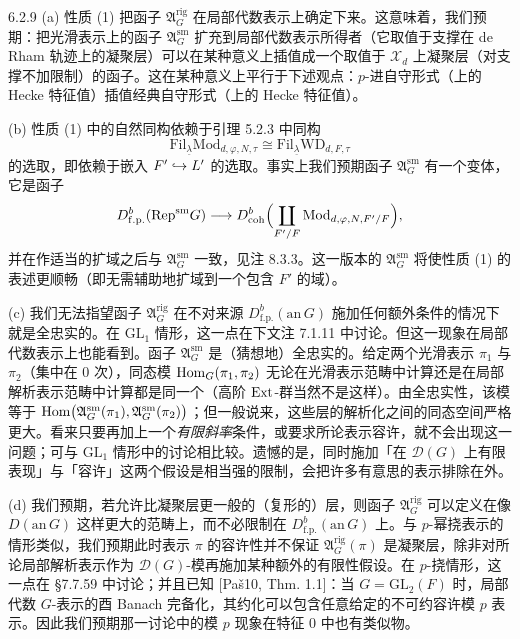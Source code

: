 \begin{rem}{6.2.9}
(a) 性质 (1) 把函子 $\mathfrak A^{\mathrm{rig}}_G$ 在局部代数表示上确定下来。这意味着，我们预期：把光滑表示上的函子 $\mathfrak A^{\mathrm{sm}}_G$ 扩充到局部代数表示所得者（它取值于支撑在 de Rham 轨迹上的凝聚层）可以在某种意义上插值成一个取值于 $\mathcal X_d$ 上凝聚层（对支撑不加限制）的函子。这在某种意义上平行于下述观点：$p$-进自守形式（上的 Hecke 特征值）插值经典自守形式（上的 Hecke 特征值）。

(b) 性质 (1) 中的自然同构依赖于引理 5.2.3 中同构
\[
\mathrm{Fil}_{\underline\lambda}\mathrm{Mod}_{d,\varphi,N,\tau}
\cong\mathrm{Fil}_{\underline\lambda}\mathrm{WD}_{d,F,\tau}
\]
的选取，即依赖于嵌入 $F'\hookrightarrow L'$ 的选取。事实上我们预期函子 $\mathfrak A^{\mathrm{sm}}_G$ 有一个变体，它是函子
\[
D^b_{\mathrm{f.p.}}(\mathrm{Rep}^{\mathrm{sm}}G)
\longrightarrow D^b_{\mathrm{coh}}\Bigl(\coprod_{F'/F}\mathrm{Mod}_{d,\varphi,N,F'/F}\Bigr),
\]
并在作适当的扩域之后与 $\mathfrak A^{\mathrm{sm}}_G$ 一致，见注 8.3.3。这一版本的 $\mathfrak A^{\mathrm{sm}}_G$ 将使性质 (1) 的表述更顺畅（即无需辅助地扩域到一个包含 $F'$ 的域）。
\end{rem}

(c) 我们无法指望函子 $\mathfrak A^{\mathrm{rig}}_G$ 在不对来源 $D^b_{\mathrm{f.p.}}(\mathrm{an}\,G)$ 施加任何额外条件的情况下就是全忠实的。在 $\mathrm{GL}_1$ 情形，这一点在下文注 7.1.11 中讨论。但这一现象在局部代数表示上也能看到。函子 $\mathfrak A^{\mathrm{sm}}_G$ 是（猜想地）全忠实的。给定两个光滑表示 $\pi_1$ 与 $\pi_2$（集中在 0 次），同态模 $\operatorname{Hom}_G(\pi_1,\pi_2)$ 无论在光滑表示范畴中计算还是在局部解析表示范畴中计算都是同一个（高阶 $\operatorname{Ext}$-群当然不是这样）。由全忠实性，该模等于 $\operatorname{Hom}\bigl(\mathfrak A^{\mathrm{sm}}_G(\pi_1),\mathfrak A^{\mathrm{sm}}_G(\pi_2)\bigr)$；但一般说来，这些层的解析化之间的同态空间严格更大。看来只要再加上一个\emph{有限斜率}条件，或要求所论表示容许，就不会出现这一问题；可与 $\mathrm{GL}_1$ 情形中的讨论相比较。遗憾的是，同时施加「在 $\mathcal D(G)$ 上有限表现」与「容许」这两个假设是相当强的限制，会把许多有意思的表示排除在外。

(d) 我们预期，若允许比凝聚层更一般的（复形的）层，则函子 $\mathfrak A^{\mathrm{rig}}_G$ 可以定义在像 $D(\mathrm{an}\,G)$ 这样更大的范畴上，而不必限制在 $D^b_{\mathrm{f.p.}}(\mathrm{an}\,G)$ 上。与 $p$-幂挠表示的情形类似，我们预期此时表示 $\pi$ 的容许性并不保证 $\mathfrak A^{\mathrm{rig}}_G(\pi)$ 是凝聚层，除非对所论局部解析表示作为 $\mathcal D(G)$-模再施加某种额外的有限性假设。在 $p$-挠情形，这一点在 §7.7.59 中讨论；并且已知 [Paš10, Thm. 1.1]：当 $G=\mathrm{GL}_2(F)$ 时，局部代数 $G$-表示的酉 Banach 完备化，其约化可以包含任意给定的不可约容许模 $p$ 表示。因此我们预期那一讨论中的模 $p$ 现象在特征 0 中也有类似物。

